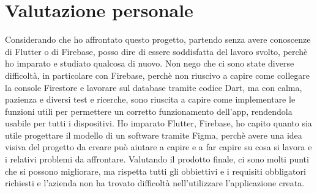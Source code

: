 \section{Valutazione personale}
Considerando che ho affrontato questo progetto, partendo senza avere conoscenze di Flutter o di Firebase, posso dire di essere soddisfatta del lavoro svolto, perchè ho imparato e studiato qualcosa di nuovo.\newline
\newline
Non nego che ci sono state diverse difficoltà, in particolare con Firebase, perchè non riuscivo a capire come collegare la console Firestore e lavorare sul database tramite codice Dart, ma con calma, pazienza e diversi test e ricerche, sono riuscita a capire come implementare le funzioni utili per permettere un corretto funzionamento dell'app, rendendola usabile per tutti i dispositivi.\newline
\newline
Ho imparato Flutter, Firebase, ho capito quanto sia utile progettare il modello di un software tramite Figma, perchè avere una idea visiva del progetto da creare può aiutare a capire e a far capire su cosa si lavora e i relativi problemi da affrontare.\newline
\newline
Valutando il prodotto finale, ci sono molti punti che si possono migliorare, ma rispetta tutti gli obbiettivi e i requisiti obbligatori richiesti e l'azienda non ha trovato difficoltà nell'utilizzare l'applicazione creata.\newline
